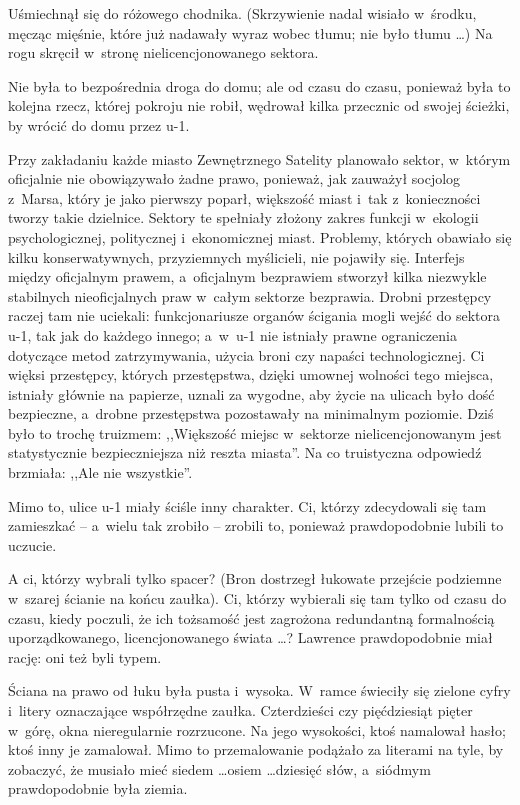 \documentclass[oneside,polish,11pt,rmheadings]{mwbk}
\begin{document}
Uśmiechnął się do różowego chodnika. (Skrzywienie nadal wisiało w~środku, męcząc mięśnie, które już nadawały wyraz wobec tłumu; nie było tłumu \ldots ) Na rogu skręcił w~stronę nielicencjonowanego sektora. 

Nie była to bezpośrednia droga do domu; ale od czasu do czasu, ponieważ była to kolejna rzecz, której pokroju nie robił, wędrował kilka przecznic od swojej ścieżki, by wrócić do domu przez u-1. 

Przy zakładaniu każde miasto Zewnętrznego Satelity planowało sektor, w~którym oficjalnie nie obowiązywało żadne prawo, ponieważ, jak zauważył socjolog z~Marsa, który je jako pierwszy poparł, większość miast i~tak z~konieczności tworzy takie dzielnice. Sektory te spełniały złożony zakres funkcji w~ekologii psychologicznej, politycznej i~ekonomicznej miast. Problemy, których obawiało się kilku konserwatywnych, przyziemnych myślicieli, nie pojawiły się. Interfejs między oficjalnym prawem, a~oficjalnym bezprawiem stworzył kilka niezwykle stabilnych nieoficjalnych praw w~całym sektorze bezprawia. Drobni przestępcy raczej tam nie uciekali: funkcjonariusze organów ścigania mogli wejść do sektora u-1, tak jak do każdego innego; a~w~u-1 nie istniały prawne ograniczenia dotyczące metod zatrzymywania, użycia broni czy napaści technologicznej. Ci więksi przestępcy, których przestępstwa, dzięki umownej wolności tego miejsca, istniały głównie na papierze, uznali za wygodne, aby życie na ulicach było dość bezpieczne, a~drobne przestępstwa pozostawały na minimalnym poziomie. Dziś było to trochę truizmem: ,,Większość miejsc w~sektorze nielicencjonowanym jest statystycznie bezpieczniejsza niż reszta miasta''. Na co truistyczna odpowiedź brzmiała: ,,Ale nie wszystkie''. 

Mimo to, ulice u-1 miały ściśle inny charakter. Ci, którzy zdecydowali się tam zamieszkać -- a~wielu tak zrobiło -- zrobili to, ponieważ prawdopodobnie lubili to uczucie. 

A ci, którzy wybrali tylko spacer? (Bron dostrzegł łukowate przejście podziemne w~szarej ścianie na końcu zaułka). Ci, którzy wybierali się tam tylko od czasu do czasu, kiedy poczuli, że ich tożsamość jest zagrożona redundantną formalnością uporządkowanego, licencjonowanego świata \ldots ? Lawrence prawdopodobnie miał rację: oni też byli typem. 

Ściana na prawo od łuku była pusta i~wysoka. W~ramce świeciły się zielone cyfry i~litery oznaczające współrzędne zaułka. Czterdzieści czy pięćdziesiąt pięter w~górę, okna nieregularnie rozrzucone. Na jego wysokości, ktoś namalował hasło; ktoś inny je zamalował. Mimo to przemalowanie podążało za literami na tyle, by zobaczyć, że musiało mieć siedem \ldots  osiem \ldots  dziesięć słów, a~siódmym prawdopodobnie była ziemia. 
\end{document}
